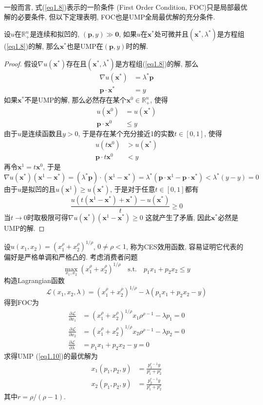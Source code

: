 \documentclass[cn, 12pt, math=mtpro2, bibstyle=apa, blue, twocol]{elegantbook}
\newcommand{\R}{\mathbb{R}}
\newcommand{\p}{\mathbf{p}}
\newcommand{\x}{\mathbf{x}}
\begin{document}
一般而言, 式(\ref{eq1.8})表示的一阶条件 (First Order Condition, FOC)只是局部最优解的必要条件, 但以下定理表明, FOC也是UMP全局最优解的充分条件.

\begin{theorem}
  设$u$在$\R_+^n$是连续和拟凹的, $(\p,y)\gg\mathbf{0}$, 如果$u$在$\x^\ast$处可微并且$(\x^\ast,\lambda^\ast)$是方程组(\ref{eq1.8})的解, 那么$\x^\ast$也是UMP在$(\p,y)$时的解.
\end{theorem}
\begin{proof}
  假设$\nabla u(\x^\ast)$存在且$(\x^\ast,\lambda^\ast)$是方程组(\ref{eq1.8})的解, 那么
  \begin{align*}
  \nabla u(\x^\ast)&=\lambda^\ast\p \\
  \p\cdot\x^\ast&=y
  \end{align*}
  如果$\x^\ast$不是UMP的解, 那么必然存在某个$\x^0\in \R^n_+$, 使得
  \begin{align*}
  u(\x^0)&=u(\x^\ast) \\
  \p\cdot\x^0&\leq y
  \end{align*}
  由于$u$是连续函数且$y>0$, 于是存在某个充分接近1的实数$t\in [0,1]$, 使得
  \begin{align*}
  u(t\x^0)&>u(\x^\ast) \\
  \p\cdot t\x^0&<y
  \end{align*}
  再令$\x^1=t\x^0$, 于是
  $$\nabla u(\x^\ast)(\x^1-\x^\ast)=(\lambda^\ast\p)\cdot(\x^1-\x^\ast)=\lambda^\ast(\p\cdot\x^1-\p\cdot\x^\ast)<\lambda^\ast(y-y)=0$$
  由于$u$是拟凹的且$u(\x^1)\geq u(\x^\ast)$, 于是对于任意$t\in[0,1]$都有
  $$\frac{u(t(\x^1-\x^\ast)+\x^\ast)-u(\x^\ast)}{t}\ge0$$
  当$t\to0$时取极限可得$\nabla u(\x^\ast)(\x^1-\x^\ast)\ge 0$
  这就产生了矛盾, 因此$\x^\ast$必然是UMP的解.
\end{proof}
\begin{example}
设$u(x_1,x_2)=(x_1^\rho+x_2^\rho)^{1/\rho}$, $0\ne \rho<1$, 称为CES效用函数, 容易证明它代表的偏好是严格单调和严格凸的. 考虑消费者问题
\begin{equation}\label{eq1.10}
  \max_{x_1,x_2}(x_1^\rho+x_2^\rho)^{1/\rho}\quad \text{s.t.}\quad p_1x_1+p_2x_2\leq y
\end{equation}
构造Lagrangian函数
$$\mathcal{L}(x_1,x_2,\lambda)=(x_1^\rho+x_2^\rho)^{1/\rho}-\lambda(p_1x_1+p_2x_2-y)$$
得到FOC为
\begin{align*}
\frac{\partial \mathcal{L}}{\partial x_1}&=(x_1^\rho+x_2^\rho)^{1/\rho}x_1\rho^{\rho-1}-\lambda p_1=0 \\
\frac{\partial \mathcal{L}}{\partial x_2}&=(x_1^\rho+x_2^\rho)^{1/\rho}x_2\rho^{\rho-1}-\lambda p_2=0 \\
\frac{\partial \mathcal{L}}{\partial \lambda}&=p_1x_1+p_2x_2-y=0
\end{align*}
求得UMP (\ref{eq1.10})的最优解为
\begin{align*}
x_1(p_1,p_2,y)&=\frac{p_1^{r-1}y}{p_1^r+p_2^r} \\
x_2(p_1,p_2,y)&=\frac{p_2^{r-1}y}{p_1^r+p_2^r}
\end{align*}
其中$r=\rho/(\rho-1)$.
\end{example}
\end{document}
